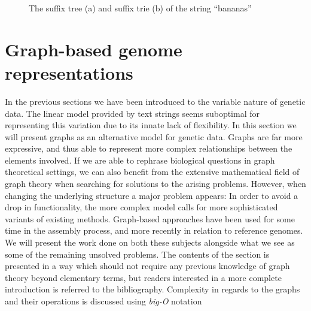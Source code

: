 \documentclass[thesis.tex]{subfiles}
\begin{document}
\begin{figure}[!b]
\begin{minipage}[t]{0.49\textwidth}
\begin{subfigure}[t]{\textwidth}
\begin{mdframed}
\begin{center}
      \end{center}
    \end{mdframed}
    \caption{}
    \label{fig:suffix_tree}
  \end{subfigure}
  \begin{minipage}[t]{0.49\textwidth}
    \caption{The suffix tree (a) and suffix trie  (b) of the string ``bananas''}
  \end{minipage}
  \end{minipage}
  \label{fig:suffix_trees}
\end{figure}
\clearpage
\section{Graph-based genome representations}
In the previous sections we have been introduced to the variable nature of genetic data. The linear model provided by text strings seems suboptimal for representing this variation due to its innate lack of flexibility. In this section we will present graphs as an alternative model for genetic data. Graphs are far more expressive, and thus able to represent more complex relationships between the elements involved. If we are able to rephrase biological questions in graph theoretical settings, we can also benefit from the extensive mathematical field of graph theory when searching for solutions to the arising problems. However, when changing the underlying structure a major problem appears: In order to avoid a drop in functionality, the more complex model calls for more sophisticated variants of existing methods. Graph-based approaches have been used for some time in the assembly process, and more recently in relation to reference genomes. We will present the work done on both these subjects alongside what we see as some of the remaining unsolved problems. The contents of the section is presented in a way which should not require any previous knowledge of graph theory beyond elementary terms, but readers interested in a more complete introduction is referred to the bibliography\cite[Chapter 9]{data_structures_and_algorithm_analysis_in_java}\cite[Chapter 11]{algorithms_sequential_parallell_and_distributed}\cite[Chapter 0]{introduction_to_the_theory_of_computation}. Complexity in regards to the graphs and their operations is discussed using \textit{big-O} notation\cite[Chapter 2]{data_structures_and_algorithm_analysis_in_java}\cite[Section 3.1]{algorithms_sequential_parallell_and_distributed}
\end{document}
